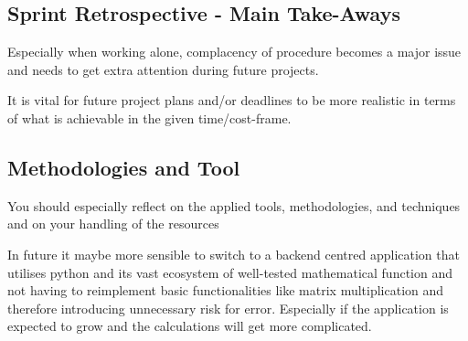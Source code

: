 \subsection{Sprint Retrospective - Main Take-Aways}
Especially when working alone, complacency of procedure becomes a major issue and needs to get extra attention during future projects.

It is vital for future project plans and/or deadlines to be more realistic in terms of what is achievable in the given time/cost-frame.

\subsection{Methodologies and Tool}
You should especially reflect on the applied tools, methodologies, and techniques and on your handling of the resources

In future it maybe more sensible to switch to a backend centred application that utilises python and its vast ecosystem of well-tested mathematical function and not having to reimplement basic functionalities like matrix multiplication and therefore introducing unnecessary risk for error. Especially if the application is expected to grow and the calculations will get more complicated.